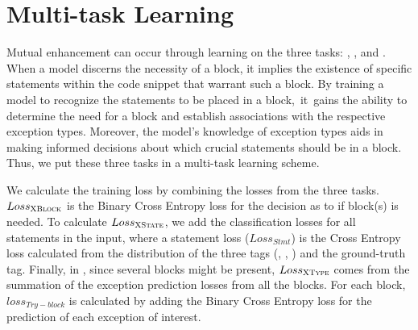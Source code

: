\section{Multi-task Learning}
\label{sec:multitasking}


Mutual enhancement can occur through learning on the three tasks:
{\xblock}, {\xstate}, and {\xtype}. When a model discerns the
necessity of a  block, it implies the existence of
specific statements within the code snippet that warrant such a
block. By training a model to recognize the statements to be placed in
a  block,~it~gains the ability to determine the need for a
 block and establish associations with the respective
exception types. Moreover, the model's knowledge of exception types
aids in making informed decisions about which crucial statements
should be in a  block. Thus, we
put these three tasks in a multi-task learning scheme.



We calculate the training loss by combining the losses from the three
tasks. $Loss_{{\textsc{XBlock}}}$ is the Binary Cross Entropy loss for the
decision as to if  block(s) is needed. To calculate
$Loss_{{\textsc{XState}}}$, we add the classification losses for all
statements in the input, where a statement loss ($Loss_{Stmt}$) is the
Cross Entropy loss calculated from the distribution of the three tags
(, , ) and the ground-truth tag.
Finally, in \xtype, since several  blocks might be
present, $Loss_{{\textsc{XType}}}$ comes from the summation of the exception
prediction losses from all the  blocks. For each
 block, $loss_{Try-block}$ is calculated by adding
the Binary Cross Entropy loss for the prediction of each exception of
interest.

